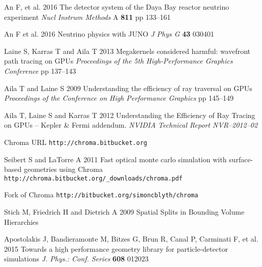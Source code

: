 \documentclass[a4paper]{jpconf}
\begin{document}
\begin{thebibliography}{9}
An F, et al.
2016
The detector system of the Daya Bay reactor neutrino experiment
{\it Nucl Instrum Methods} A {\bf 811} pp 133--161

An F et al.  
2016
Neutrino physics with JUNO
{\it J Phys G} {\bf 43} 030401















Laine S, Karras T and Aila T
2013
Megakernels considered harmful: wavefront path tracing on GPUs
{\it Proceedings of the 5th High-Performance Graphics Conference} pp 137--143

Aila T and Laine S 
2009
Understanding the efficiency of ray traversal on GPUs
{\it Proceedings of the Conference on High Performance Graphics} pp 145--149

Aila T, Laine S and Karras T
2012
Understanding the Efficiency of Ray Tracing on GPUs – Kepler \& Fermi addendum. 
{\it NVIDIA Technical Report NVR–2012–02}


Chroma URL {\tt http://chroma.bitbucket.org}

Seibert S and LaTorre A 
2011 
Fast optical monte carlo simulation with surface-based geometries using Chroma {\tt http://chroma.bitbucket.org/\_downloads/chroma.pdf}

Fork of Chroma {\tt http://bitbucket.org/simoncblyth/chroma}
















Stich M, Friedrich H and Dietrich A 
2009
Spatial Splits in Bounding Volume Hierarchies







Apostolakis J, Bandieramonte M, Bitzes G, Brun R, Canal P, Carminati F, et al. 
2015
Towards a high performance geometry library for particle-detector simulations
{\it J. Phys.: Conf. Series} {\bf 608} 012023


\end{thebibliography}
\end{document}
